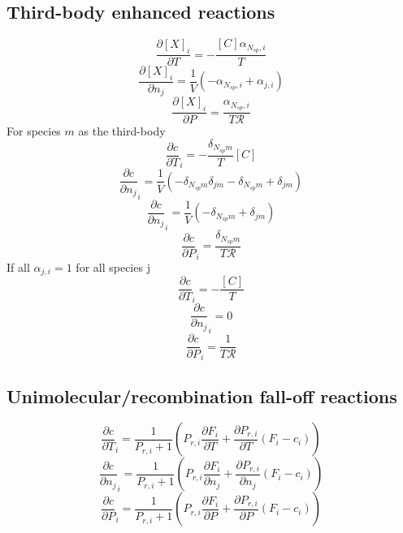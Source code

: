 \documentclass[a4paper,10pt]{article}
\newcommand{\ns}{N_{sp}}
\newcommand{\Ru}{\mathcal{R}}
\begin{document}
\subsection{Third-body enhanced reactions}
\begin{dmath} \frac{\partial [X]_i }{\partial T } = - \frac{[C] \alpha_{\ns,i}}{T}\end{dmath} 
\begin{dmath} \frac{\partial [X]_i }{\partial {n_j} } = \frac{1}{V} \left(- \alpha_{\ns,i} + \alpha_{j,i}\right)\end{dmath} 
\begin{dmath} \frac{\partial [X]_i }{\partial P } = \frac{\alpha_{\ns,i}}{T \Ru}\end{dmath} 
For species $m$ as the third-body
\begin{dmath} \frac{\partial c }{\partial T }_{i} = - \frac{\delta_{\ns m}}{T} [C]\end{dmath} 
\begin{dmath} \frac{\partial c }{\partial {n_j} }_{i} = \frac{1}{V} \left(- \delta_{\ns m} \delta_{j m} - \delta_{\ns m} + \delta_{j m}\right)\end{dmath} 
\begin{dmath} \frac{\partial c }{\partial {n_j} }_{i} = \frac{1}{V} \left(- \delta_{\ns m} + \delta_{j m}\right)\end{dmath} 
\begin{dmath} \frac{\partial c }{\partial P }_{i} = \frac{\delta_{\ns m}}{T \Ru}\end{dmath} 
If all $\alpha_{j, i} = 1$ for all species j
\begin{dmath} \frac{\partial c }{\partial T }_{i} = - \frac{[C]}{T}\end{dmath} 
\begin{dmath} \frac{\partial c }{\partial {n_j} }_{i} = 0\end{dmath} 
\begin{dmath} \frac{\partial c }{\partial P }_{i} = \frac{1}{T \Ru}\end{dmath} 
\subsection{Unimolecular/recombination fall-off reactions}
\begin{dmath} \frac{\partial c }{\partial T }_{i} = \frac{1}{P_{r, i} + 1} \left(P_{r, i} \frac{\partial F_{i} }{\partial T } + \frac{\partial P_{r, i} }{\partial T } \left(F_{i} - c_{i}\right)\right)\end{dmath} 
\begin{dmath} \frac{\partial c }{\partial {n_j} }_{i} = \frac{1}{P_{r, i} + 1} \left(P_{r, i} \frac{\partial F_{i} }{\partial {n_j} } + \frac{\partial P_{r, i} }{\partial {n_j} } \left(F_{i} - c_{i}\right)\right)\end{dmath} 
\begin{dmath} \frac{\partial c }{\partial P }_{i} = \frac{1}{P_{r, i} + 1} \left(P_{r, i} \frac{\partial F_{i} }{\partial P } + \frac{\partial P_{r, i} }{\partial P } \left(F_{i} - c_{i}\right)\right)\end{dmath} 
\end{document}
